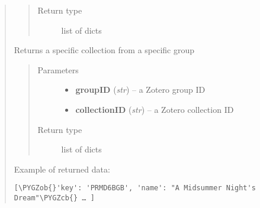 \documentclass[letterpaper,10pt,english]{sphinxmanual}
\def\PYGZob{\char`\{}
\def\PYGZcb{\char`\}}
\begin{document}
\begin{quote}
\begin{fulllineitems}
\begin{quote}
\begin{description}
\item[{Return type}] \leavevmode
list of dicts

\end{description}\end{quote}

\end{fulllineitems}


\begin{fulllineitems}
\label{index:pyzotero.zotero.Zotero.group_collection}
Returns a specific collection from a specific group
\begin{quote}\begin{description}
\item[{Parameters}] \leavevmode\begin{itemize}
\item {} 
\textbf{groupID} (\emph{str}) -- a Zotero group ID

\item {} 
\textbf{collectionID} (\emph{str}) -- a Zotero collection ID

\end{itemize}

\item[{Return type}] \leavevmode
list of dicts

\end{description}\end{quote}

\end{fulllineitems}


Example of returned data:

\begin{Verbatim}[commandchars=\\\{\}]
[\PYGZob{}'key': 'PRMD6BGB', 'name': "A Midsummer Night's Dream"\PYGZcb{} … ]
\end{Verbatim}
\end{quote}
\end{document}
